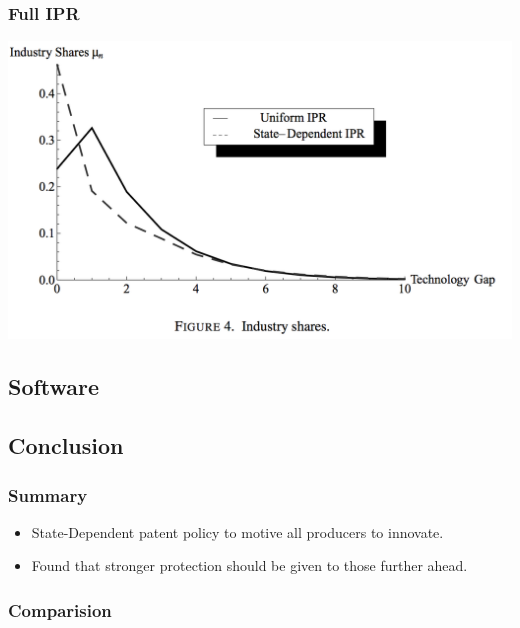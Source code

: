 \documentclass{beamer}
\begin{document}
\begin{frame}[t]\frametitle{Full IPR} 
  \begin{center}
    \includegraphics[scale=.28]{full_ipr_distbn.png}
    \label{fig:full_ipr_distbn}
  \end{center}
\end{frame}


\subsection{Software}
\label{sub:software}

\subsection{Conclusion}
\label{sub:conclusion}

\begin{frame}[t]\frametitle{Summary}
  \begin{itemize}
    \item<+-> State-Dependent patent policy to motive all producers to innovate.
    \item<+-> Found that stronger protection should be given to those further ahead.
  \end{itemize}  
\end{frame}

\begin{frame}[t]\frametitle{Comparision}
    


\end{frame}
\end{document}
